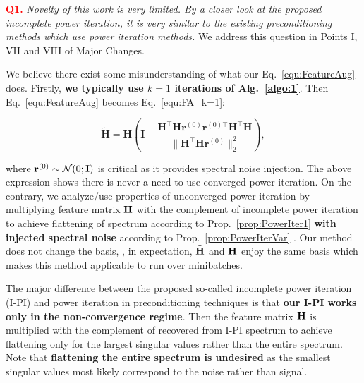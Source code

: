 \vspace{0.4cm} \noindent\textcolor{red}{\bf Q1. } {\em Novelty of this work is very limited. By a closer look at the proposed incomplete power iteration, it is very similar to the existing preconditioning methods which use power iteration methods.}
%
We address this question in {\color{blue}Points I, VII and VIII} of {\color{blue}Major Changes}. 

We believe there exist some misunderstanding of what our Eq.~\eqref{equ:FeatureAug} does. Firstly, \textbf{we typically use $k=1$ iterations of Alg.~\ref{algo:1}}. Then Eq.~\eqref{equ:FeatureAug} becomes Eq.~\eqref{equ:FA_k=1}:

$$ \tilde{\mathbf{H}}=\mathbf{H}\left(\mathbf{I} - \frac{\mathbf{H}^\top\mathbf{H}\mathbf{r}^{(0)}\mathbf{r}^{(0)\top}\mathbf{H}^\top\mathbf{H}}{\|\mathbf{H}^\top\mathbf{H}\mathbf{r}^{(0)}\|_2^2}\right),$$

\noindent 
where $\mathbf{r}^{(0)}\sim\mathcal{N}(0;{\bf I})$ is critical as it provides spectral noise injection. The above expression shows there is never a need to use converged power iteration. On the contrary, we analyze/use properties of unconverged power iteration by multiplying feature matrix ${\bf H}$ with the complement of incomplete power iteration  to achieve flattening of spectrum according to Prop.~\ref{prop:PowerIter1} \textbf{with injected spectral noise} according to Prop.~\ref{prop:PowerIterVar} . Our method does not change the basis, \ie, in expectation, $\tilde{\bf H}$ and ${\bf H}$ enjoy the same basis which makes this method applicable to run over minibatches.

The major difference between the proposed so-called incomplete power iteration (I-PI) and power iteration in preconditioning techniques is that \textbf{our I-PI works only in the non-convergence regime}. Then the feature matrix ${\bf H}$ is multiplied with the complement of recovered from I-PI spectrum to achieve flattening only for the largest singular values rather than the entire spectrum. Note that \textbf{flattening the entire spectrum is undesired} as the smallest singular values most likely correspond to the noise rather than signal.

